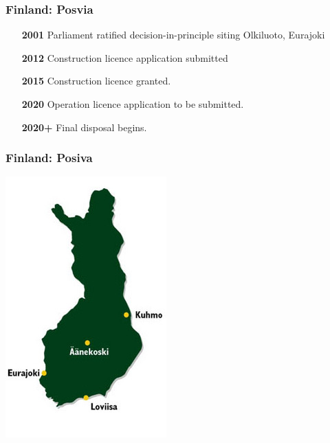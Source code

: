 \begin{frame}[c]
\frametitle{Finland: Posvia}

\begin{itemize}
\item[\textbf{2001}]  Parliament ratified decision-in-principle siting Olkiluoto, Eurajoki
\item[\textbf{2012}] Construction licence application submitted
\item[\textbf{2015}] Construction licence granted.
\item[\textbf{2020}] Operation licence application to be submitted.
\item[\textbf{2020+}] Final disposal begins.
\end{itemize}
\end{frame}

\begin{frame}[c]
\frametitle{Finland: Posiva}
\includegraphics[height=\textheight]{./images/finland-site}
\cite{posiva_safety_2017}
\end{frame}



